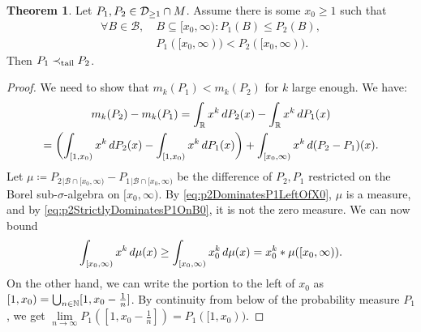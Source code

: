 \documentclass[a4paper]{scrreprt}
\newcommand{\B}{\mathcal{B}}
\newcommand{\M}{M}
\theoremstyle{definition}
\newtheorem{thm}{Theorem}[chapter] %
\begin{document}
    \begin{thm}
        Let $P_1, P_2 \in \Dgeqone \cap \M$. Assume there is some $x_0 \geq 1$ such that
        \begin{align}
            \forall B \in \B, &~B \subseteq [x_0, \infty): P_1(B) \leq P_2(B)  \label{eq:p2DominatesP1LeftOfX0},  \\
            &~P_1([x_0, \infty)) < P_2([x_0, \infty)) \label{eq:p2StrictlyDominatesP1OnB0}.
        \end{align}
        Then $P_1 \prec_{\text{tail}} P_2$.
        \label{thm:tailOrderSufficientConditionsGeneral}
    \end{thm}    
    \begin{proof}
        We need to show that $m_k(P_1) < m_k(P_2)$ for $k$ large enough. We have:
        \begin{multline*}
            m_k(P_2) - m_k(P_1)
            = \int_{\mathbb{R}} x^k \, dP_2(x) - \int_{\mathbb{R}} x^k \, dP_1(x) \\
            = \biggl(\int_{[1, x_0)} x^k \, dP_2(x) - \int_{[1, x_0)} x^k \, dP_1(x)\biggr)
            + \int_{[x_0, \infty)} x^k \, d(P_2 - P_1)(x).
        \end{multline*}
        Let $\mu \coloneqq P_2{}_{\vert \B \cap [x_0, \infty)} - P_1{}_{\vert \B \cap [x_0, \infty)}$ be the difference of $P_2, P_1$ restricted on the Borel sub-$\sigma$-algebra on $[x_0, \infty)$. By \eqref{eq:p2DominatesP1LeftOfX0}, $\mu$ is a measure, and by \eqref{eq:p2StrictlyDominatesP1OnB0}, it is not the zero measure.
        We can now bound
        \begin{gather*}
            \int_{[x_0, \infty)} x^k \, d\mu(x)
            \geq \int_{[x_0, \infty)} x_0^k \, d\mu(x)
            = x_0^k * \mu([x_0, \infty)).
        \end{gather*}
        On the other hand, we can write the portion to the left of $x_0$ as $[1, x_0) = \bigcup_{n \in \mathbb{N}} [1, x_0 - \frac{1}{n}]$.
        By continuity from below of the probability measure $P_1$, we get $\lim\limits_{n \to \infty} P_1([1, x_0 - \frac{1}{n}]) = P_1([1, x_0))$.

\end{proof}
\end{document}
